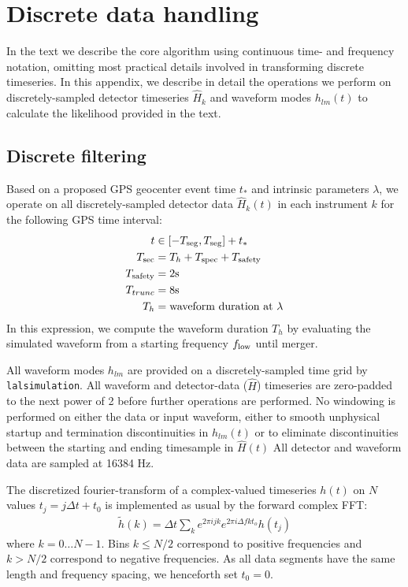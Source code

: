 \documentclass[twocolumn,prd,nofootinbib]{revtex4}
\newcommand\unit[1]{{\rm #1}}
\begin{document}
\section{Discrete data handling}

In the text we describe the core algorithm using continuous time- and frequency notation, omitting most practical
details involved in transforming discrete timeseries.  In this appendix, we describe in detail the operations we perform
on discretely-sampled detector timeseries $\hat{H}_k$  and  waveform modes $h_{lm}(t)$ to calculate the likelihood
provided in the text.

\subsection{Discrete filtering}

Based on a proposed GPS geocenter event time $t_*$ and intrinsic parameters $\lambda$, we operate on all discretely-sampled detector
data $\hat{H}_k(t)$  in each instrument $k$ for the following GPS time interval:
\begin{align}
t &\in [-T_{\rm seg},T_{\rm seg}]+t_{*} \\
T_{\rm sec} &= T_h+T_{\rm spec} +T_{\rm safety} \\
T_{\rm safety} &= 2\unit{s} \\
 T_{trunc} &= 8 \unit{s} \\
T_h &= \text{waveform duration at }\lambda
\end{align}
In this expression, we compute the waveform duration $T_h$ by evaluating the simulated waveform from a starting
frequency $f_{\rm low}$ until merger. 

All waveform modes $h_{lm}$ are provided on a discretely-sampled time grid by \texttt{lalsimulation}.  
%
All waveform and detector-data ($\hat{H}$) timeseries are zero-padded to the next power of 2 before further operations are
performed.  
%
No windowing is performed on either the data or input waveform, either to smooth unphysical startup and termination
discontinuities in $h_{lm}(t)$ or to eliminate discontinuities between the starting and ending timesample in $\hat{H}(t)$
%
All detector and waveform data are sampled at 16384 Hz.  
%


The discretized fourier-transform of a complex-valued timeseries $h(t)$ on $N$  values $t_j=j\Delta t+t_0$ is
implemented as usual by the forward complex FFT:
\begin{eqnarray}
\tilde{h}(k) = \Delta t  \sum_k e^{2\pi i j k} e^{2\pi i \Delta f k t_o} h(t_j)
\end{eqnarray}
where $k=0\ldots N-1$.  Bins $k\le N/2$ correspond to positive frequencies and $k>N/2$ correspond to  negative
frequencies.    As all data segments  have the same length and frequency spacing, we henceforth set $t_0=0$.  
% 
\end{document}

